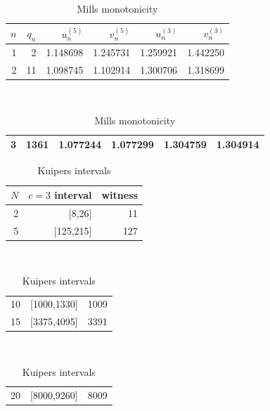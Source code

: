 \documentclass[11pt,reqno]{amsart}
\theoremstyle{blueplain}
\numberwithin{equation}{section}
\begin{document}
{\begin{table}[H]
	\centering
	\caption{Mills monotonicity}
	\begin{tabular}{rrrrrr}
		\toprule $n$ & $q_n$ & $u_n^{(5)}$ & $v_n^{(5)}$ & $u_n^{(3)}$ & $v_n^{(3)}$
		\\ 
		\midrule 1 & 2 & 1.148698 & 1.245731 & 1.259921 & 1.442250 \\ 
		2 & 11 & 1.098745 & 1.102914 & 1.300706 & 1.318699 \\ 
		
	\end{tabular}%
	\noindent \hspace{1em}\\[0pt]
	\noindent 
	\begin{tabular}{rrrrrr}
		3 & 1361 & 1.077244 & 1.077299 & 1.304759 & 1.304914 \\ 
		\bottomrule   
	\end{tabular}
	
\end{table}



\text{\ } \newline
\text{\ } \vspace{0.3in}\text{\ }

\begin{table}[H]
	\caption{Kuipers intervals}
	\centering
	\begin{tabular}{rrr}
		\toprule $N$ & $c=3$ interval & \multicolumn{1}{r}{witness} \\ 
		\midrule 2 & [8,26] & \multicolumn{1}{r}{11} \\ 
		5 & [125,215] & \multicolumn{1}{r}{127} \\ 
		
	\end{tabular}%
	\noindent \hspace{1em}\\[0pt]
	\noindent 
	\begin{tabular}{rrr}
		10 & [1000,1330] & \multicolumn{1}{r}{1009} \\ 
		15 & [3375,4095] & \multicolumn{1}{r}{3391} \\ 
		
	\end{tabular}%
	\noindent \hspace{1em}\\[0pt]
	\noindent 
	\begin{tabular}{rrr}
		20 & [8000,9260] & \multicolumn{1}{r}{8009} \\ 
		

\end{tabular}
\end{table}}
\end{document}
